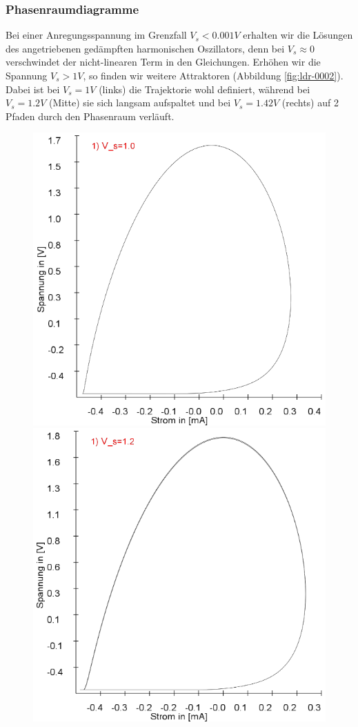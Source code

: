 \documentclass[12pt,a4paper]{article}
\begin{document}
\subsubsection{Phasenraumdiagramme}
Bei einer Anregungsspannung im Grenzfall $V_s < 0.001V$ erhalten wir die Lösungen des angetriebenen gedämpften harmonischen Oszillators, denn bei $V_s \approx 0$ verschwindet der nicht-linearen Term in den Gleichungen. 
Erhöhen wir die Spannung $V_s>1V$, so finden wir weitere Attraktoren (Abbildung \ref{fig:ldr-0002}). Dabei ist bei $V_s=1V$ (links) die Trajektorie wohl definiert, während bei $V_s=1.2V$ (Mitte) sie sich langsam aufspaltet und bei $V_s=1.42V$ (rechts) auf 2 Pfaden durch den Phasenraum verläuft.
\begin{figure}[!htbp]
\includegraphics[scale=0.28]{schwing-runge-nach300k-weitere20k-10-9-1V}
\includegraphics[scale=0.28]{schwing-runge-nach300k-weitere20k-10-9-1,2V}

\end{figure}
\end{document}

